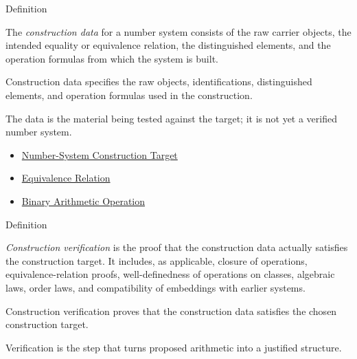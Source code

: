 \begin{definitionbox}{Definition}
\begin{definition}
\label{def:number-system-construction-data}
The \emph{construction data} for a number system consists of the raw carrier
objects, the intended equality or equivalence relation, the distinguished
elements, and the operation formulas from which the system is built.
\end{definition}

\begin{remark*}
Construction data specifies the raw objects, identifications, distinguished
elements, and operation formulas used in the construction.
\end{remark*}

\begin{remark*}[Interpretation]
The data is the material being tested against the target; it is not yet a
verified number system.
\end{remark*}
\end{definitionbox}

\begin{dependencies}
\begin{itemize}
  \item \hyperref[def:number-system-construction-target]{Number-System Construction Target}
  \item \hyperref[def:equivalence-relation]{Equivalence Relation}
  \item \hyperref[def:binary-arithmetic-operation]{Binary Arithmetic Operation}
\end{itemize}
\end{dependencies}

\begin{definitionbox}{Definition}
\begin{definition}
\label{def:number-system-construction-verification}
\emph{Construction verification} is the proof that the construction data
actually satisfies the construction target. It includes, as applicable,
closure of operations, equivalence-relation proofs, well-definedness of
operations on classes, algebraic laws, order laws, and compatibility of
embeddings with earlier systems.
\end{definition}

\begin{remark*}
Construction verification proves that the construction data satisfies the
chosen construction target.
\end{remark*}

\begin{remark*}[Interpretation]
Verification is the step that turns proposed arithmetic into a justified
structure.
\end{remark*}
\end{definitionbox}

